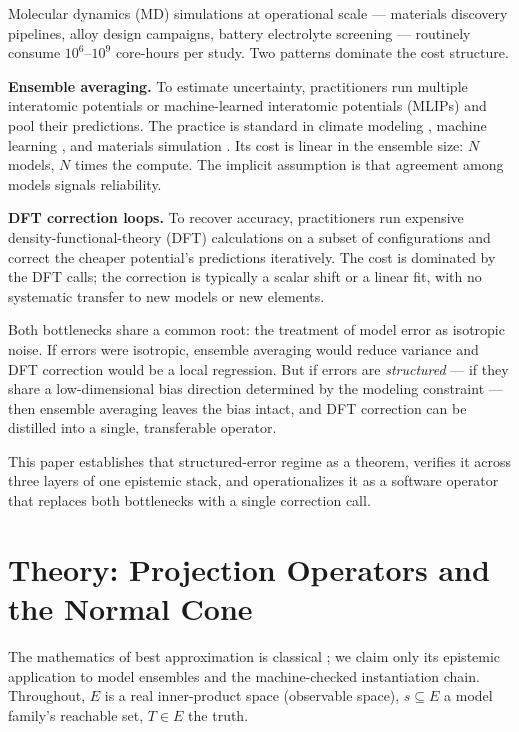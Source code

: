 \documentclass[11pt]{article}
\begin{document}
Molecular dynamics (MD) simulations at operational scale --- materials
discovery pipelines, alloy design campaigns, battery electrolyte screening ---
routinely consume $10^6$--$10^9$ core-hours per study. Two patterns dominate
the cost structure.

\textbf{Ensemble averaging.} To estimate uncertainty, practitioners run
multiple interatomic potentials or machine-learned interatomic potentials
(MLIPs) and pool their predictions. The practice is standard in climate
modeling \citep{pirtle2010,parker2011,bishop2013}, machine learning
\citep{fort2019,lakshminarayanan2017}, and materials simulation
\citep{frederiksen2004,lejaeghere2016}. Its cost is linear in the ensemble
size: $N$ models, $N$ times the compute. The implicit assumption is that
agreement among models signals reliability.

\textbf{DFT correction loops.} To recover accuracy, practitioners run
expensive density-functional-theory (DFT) calculations on a subset of
configurations and correct the cheaper potential's predictions iteratively.
The cost is dominated by the DFT calls; the correction is typically a scalar
shift or a linear fit, with no systematic transfer to new models or new
elements.

Both bottlenecks share a common root: the treatment of model error as
isotropic noise. If errors were isotropic, ensemble averaging would reduce
variance and DFT correction would be a local regression. But if errors are
\emph{structured} --- if they share a low-dimensional bias direction determined
by the modeling constraint --- then ensemble averaging leaves the bias
intact, and DFT correction can be distilled into a single, transferable
operator.

This paper establishes that structured-error regime as a theorem, verifies it
across three layers of one epistemic stack, and operationalizes it as a
software operator that replaces both bottlenecks with a single correction
call.

\section{Theory: Projection Operators and the Normal Cone}
\label{sec:theory}

The mathematics of best approximation is classical
\citep{deutsch2001,kinderlehrer1980}; we claim only its epistemic application
to model ensembles and the machine-checked instantiation chain. Throughout,
$E$ is a real inner-product space (observable space), $s \subseteq E$ a model
family's reachable set, $T \in E$ the truth.
\end{document}
